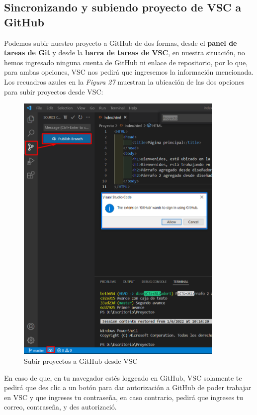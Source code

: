 \subsection{Sincronizando y subiendo proyecto de VSC a GitHub}
\hspace{0.55cm}Podemos subir nuestro proyecto a GitHub de dos formas, desde el \textbf{panel de tareas de Git} y desde la \textbf{barra de tareas de VSC}, en nuestra situación, no hemos ingresado ninguna cuenta de GitHub ni enlace de repositorio, por lo que, para ambas opciones, VSC nos pedirá que ingresemos la información mencionada. Los recuadros azules en la \textit{Figura 27} muestran la ubicación de las dos opciones para subir proyectos desde VSC:
\begin{figure}[H]
    \begin{center}
        \caption{Subir proyectos a GitHub desde VSC}
        \label{fig: 27}
        \includegraphics[width=10cm]{capturas/subir_proyecto1.png}
    \end{center}
\end{figure}

En caso de que, en tu navegador estés loggeado en GitHub, VSC solamente te pedirá que des clic a un botón para dar autorización a GitHub de poder trabajar en VSC y que ingreses tu contraseña, en caso contrario, pedirá que ingreses tu correo, contraseña, y des autorizació.

